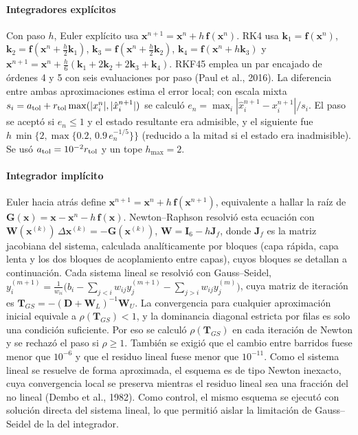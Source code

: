 \paragraph{Integradores explícitos} Con paso $h$, Euler explícito usa $\mathbf x^{n+1}=\mathbf x^n+h\,\mathbf f(\mathbf x^n)$. RK4 usa $\mathbf k_1=\mathbf f(\mathbf x^n)$, $\mathbf k_2=\mathbf f(\mathbf x^n+\tfrac h2\mathbf k_1)$, $\mathbf k_3=\mathbf f(\mathbf x^n+\tfrac h2\mathbf k_2)$, $\mathbf k_4=\mathbf f(\mathbf x^n+h\mathbf k_3)$ y $\mathbf x^{n+1}=\mathbf x^n+\tfrac h6(\mathbf k_1+2\mathbf k_2+2\mathbf k_3+\mathbf k_4)$. RKF45 emplea un par encajado de órdenes 4 y 5 con seis evaluaciones por paso (Paul et al., 2016). La diferencia entre ambas aproximaciones estima el error local; con escala mixta $s_i=a_{\rm tol}+r_{\rm tol}\max(|x_i^n|,|\hat x_i^{n+1}|)$ se calculó $e_n=\max_i|\hat x_i^{n+1}-x_i^{n+1}|/s_i$. El paso se aceptó si $e_n\le1$ y el estado resultante era admisible, y el siguiente fue $h\,\min\{2,\max\{0.2,\,0.9\,e_n^{-1/5}\}\}$ (reducido a la mitad si el estado era inadmisible). Se usó $a_{\rm tol}=10^{-2}r_{\rm tol}$ y un tope $h_{\max}=2$.

\paragraph{Integrador implícito} Euler hacia atrás define $\mathbf x^{n+1}=\mathbf x^n+h\,\mathbf f(\mathbf x^{n+1})$, equivalente a hallar la raíz de $\mathbf G(\mathbf x)=\mathbf x-\mathbf x^n-h\,\mathbf f(\mathbf x)$. Newton--Raphson resolvió esta ecuación con $\mathbf W(\mathbf x^{(k)})\,\Delta\mathbf x^{(k)}=-\mathbf G(\mathbf x^{(k)})$, $\mathbf W=\mathbf I_6-h\mathbf J_f$, donde $\mathbf J_f$ es la matriz jacobiana del sistema, calculada analíticamente por bloques (capa rápida, capa lenta y los dos bloques de acoplamiento entre capas), cuyos bloques se detallan a continuación. Cada sistema lineal se resolvió con Gauss--Seidel, $y_i^{(m+1)}=\tfrac1{w_{ii}}\bigl(b_i-\sum_{j<i}w_{ij}y_j^{(m+1)}-\sum_{j>i}w_{ij}y_j^{(m)}\bigr)$, cuya matriz de iteración es $\mathbf T_{GS}=-(\mathbf D+\mathbf W_L)^{-1}\mathbf W_U$. La convergencia para cualquier aproximación inicial equivale a $\rho(\mathbf T_{GS})<1$, y la dominancia diagonal estricta por filas es solo una condición suficiente. Por eso se calculó $\rho(\mathbf T_{GS})$ en cada iteración de Newton y se rechazó el paso si $\rho\ge1$. También se exigió que el cambio entre barridos fuese menor que $10^{-6}$ y que el residuo lineal fuese menor que $10^{-11}$. Como el sistema lineal se resuelve de forma aproximada, el esquema es de tipo Newton inexacto, cuya convergencia local se preserva mientras el residuo lineal sea una fracción del no lineal (Dembo et al., 1982). Como control, el mismo esquema se ejecutó con solución directa del sistema lineal, lo que permitió aislar la limitación de Gauss--Seidel de la del integrador.

